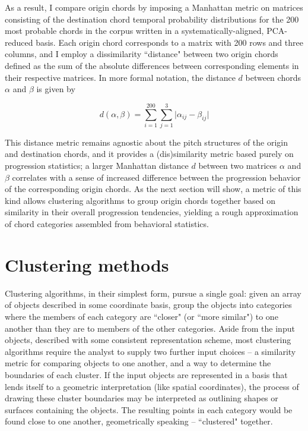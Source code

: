 As a result, I compare origin chords by imposing a Manhattan metric on matrices consisting of the destination chord temporal probability distributions for the 200 most probable chords in the corpus written in a systematically-aligned, PCA-reduced basis.  Each origin chord corresponds to a matrix with 200 rows and three columns, and I employ a dissimilarity ``distance" between two origin chords defined as the sum of the absolute differences between corresponding elements in their respective matrices.  In more formal notation, the distance $d$ between chords $\alpha$ and $\beta$ is given by

\begin{equation}
d(\alpha, \beta) = \sum_{i=1}^{200} \sum_{j=1}^3 \lvert \alpha_{ij} - \beta_{ij} \rvert
\end{equation}

This distance metric remains agnostic about the pitch structures of the origin and destination chords, and it provides a (dis)similarity metric based purely on progression statistics; a larger Manhattan distance $d$ between two matrices $\alpha$ and $\beta$ correlates with a sense of increased difference between the progression behavior of the corresponding origin chords.  As the next section will show, a metric of this kind allows clustering algorithms to group origin chords together based on similarity in their overall progression tendencies, yielding a rough approximation of chord categories assembled from behavioral statistics.

\section{Clustering methods}
Clustering algorithms, in their simplest form, pursue a single goal: given an array of objects described in some coordinate basis, group the objects into categories where the members of each category are ``closer" (or ``more similar") to one another than they are to members of the other categories.  Aside from the input objects, described with some consistent representation scheme, most clustering algorithms require the analyst to supply two further input choices -- a similarity metric for comparing objects to one another, and a way to determine the boundaries of each cluster.  If the input objects are represented in a basis that lends itself to a geometric interpretation (like spatial coordinates), the process of drawing these cluster boundaries may be interpreted as outlining shapes or surfaces containing the objects.  The resulting points in each category would be found close to one another, geometrically speaking -- ``clustered" together.

